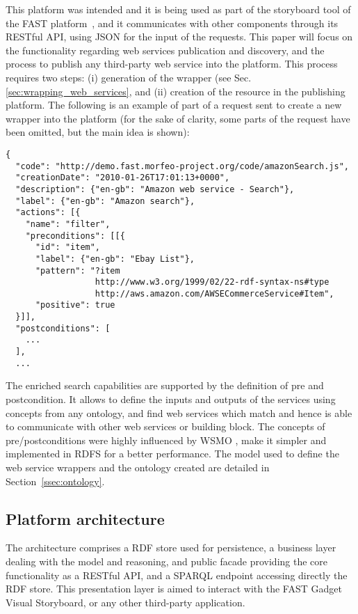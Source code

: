 This platform was intended and it is being used as part of the storyboard tool of the FAST platform~\cite{hoyer2009fast}, and it communicates with other components through its RESTful API, using JSON for the input of the requests. This paper will focus on the functionality regarding web services publication and discovery, and the process to publish any third-party web service into the platform. This process requires two steps: (i) generation of the wrapper (see Sec. \ref{sec:wrapping_web_services}, and (ii) creation of the resource in the publishing platform. The following is an example of part of a request sent to create a new wrapper into the platform (for the sake of clarity, some parts of the request have been omitted, but the main idea is shown):

\begin{listing}
\begin{verbatim}
{
  "code": "http://demo.fast.morfeo-project.org/code/amazonSearch.js",
  "creationDate": "2010-01-26T17:01:13+0000",
  "description": {"en-gb": "Amazon web service - Search"},
  "label": {"en-gb": "Amazon search"},
  "actions": [{
    "name": "filter",
    "preconditions": [[{
      "id": "item",
      "label": {"en-gb": "Ebay List"},
      "pattern": "?item
                  http://www.w3.org/1999/02/22-rdf-syntax-ns#type
                  http://aws.amazon.com/AWSECommerceService#Item",
      "positive": true
  }]],
  "postconditions": [
    ...
  ],
  ...
\end{verbatim}
\label{lis:json_request}
\end{listing}

The enriched search capabilities are supported by the definition of pre and postcondition. It allows to define the inputs and outputs of the services using concepts from any ontology, and find web services which match and hence is able to communicate with other web services or building block. The concepts of pre/postconditions were highly influenced by WSMO \cite{roman2005}, make it simpler and implemented in RDFS for a better performance. The model used to define the web service wrappers and the ontology created are detailed in Section~\ref{ssec:ontology}.

\subsection{Platform architecture}
\label{ssec:architecture}

The architecture comprises a RDF store used for persistence, a business layer dealing with the model and reasoning, and public facade providing the core functionality as a RESTful API, and a SPARQL endpoint accessing directly the RDF store. This presentation layer is aimed to interact with the FAST Gadget Visual Storyboard, or any other third-party application.

